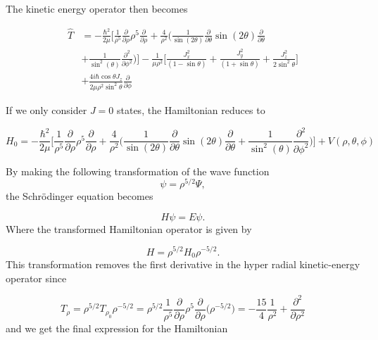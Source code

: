 \documentclass{article}
\numberwithin{equation}{section}
\numberwithin{figure}{section}
\begin{document}
The kinetic energy operator then becomes

\begin{align*}
\hat{T} &=-\frac{\hbar^2}{2\mu}\Bigg[\frac{1}{\rho^5}\frac{\partial}{\partial\rho}\rho^5\frac{\partial}{\partial\rho} + \frac{4}{\rho^2}\Bigg(\frac{1}{\sin(2\theta)}\frac{\partial}{\partial\theta}\sin(2\theta)\frac{\partial}{\partial\theta}\\
&+\frac{1}{\sin^2(\theta)}\frac{\partial^2}{\partial\phi^2} \Bigg)\Bigg]-\frac{1}{\mu\rho^2}\Bigg[\frac{J^2_x}{(1-\sin\theta)} + \frac{J^2_y}{(1+\sin\theta)} +\frac{J^2_z}{2\sin^2\theta}\Bigg]\\
&+ \frac{4i\hbar\cos\theta J_z}{2\mu\rho^2\sin^2\theta}\frac{\partial}{\partial\phi}
\end{align*}

If we only consider $J=0$ states, the Hamiltonian reduces to 

\begin{equation}
H_{0} = -\frac{\hbar^{2}}{2 \mu} \Bigg[ \frac{1}{\rho^{5}} \frac{\partial}{\partial \rho} \rho^{5} \frac{\partial}{\partial \rho} + \frac{4}{\rho^{2}}\Big( \frac{1}{\sin(2\theta)} \frac{\partial}{\partial \theta} \sin(2\theta) \frac{\partial}{\partial \theta} + \frac{1}{\sin^{2}(\theta)} \frac{\partial^{2}}{\partial \phi^{2}} \Big) \Bigg] + V(\rho, \theta, \phi)
\end{equation}

By making the following transformation of the wave function 
\begin{equation}
\psi = \rho^{5/2} \Psi,
\end{equation}
the Schr{\"o}dinger equation becomes

\begin{equation}
H \psi = E \psi. 
\end{equation}
Where the transformed Hamiltonian operator is given by

\begin{equation}
H = \rho^{5/2}H_{0} \rho^{-5/2}. 
\end{equation}
This transformation removes the first derivative in the hyper radial kinetic-energy operator since

\begin{equation}
T_{\rho} = \rho^{5/2}T_{\rho_{0}}\rho^{-5/2} = \rho^{5/2} \frac{1}{\rho^{5}} \frac{\partial}{\partial \rho} \rho^{5} \frac{\partial}{\partial \rho} \Big( \rho^{-5/2} \Big) = -\frac{15}{4} \frac{1}{\rho^{2}} + \frac{\partial^{2}}{\partial \rho^{2}}
\end{equation}
and we get the final expression for the Hamiltonian
\end{document}
